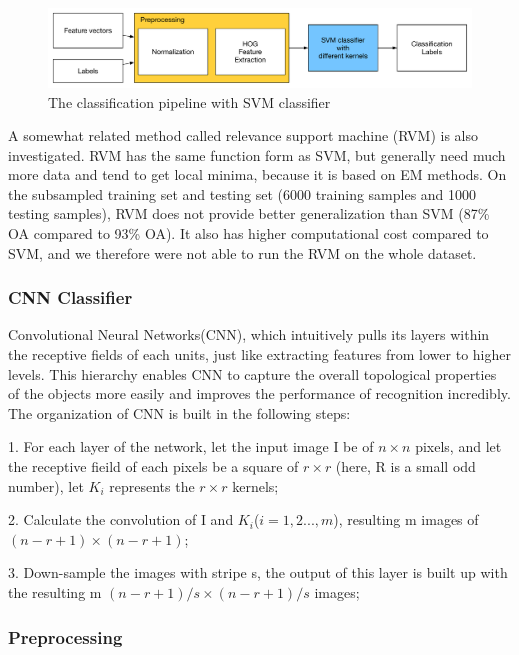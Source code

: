 \documentclass[12pt]{article}
\begin{document}
\begin{figure}[tbp]
	\centering
	\includegraphics[width =\textwidth]{pipeline-svm}		
	\caption{The classification pipeline with SVM classifier}
	\label{fig:pipeline-svm}
\end{figure}

A somewhat related method called relevance support machine (RVM) \cite{tipping2001sparse} is also investigated. RVM has the same function form as SVM, but generally need much more data and tend to get local minima, because it is based on EM methods. On the subsampled training set and testing set (6000 training samples and 1000 testing samples), RVM does not provide better generalization than SVM (87\% OA compared to 93\% OA). It also has higher computational cost compared to SVM, and we therefore were not able to run the RVM on the whole dataset.
 
\subsubsection{CNN Classifier}
Convolutional Neural Networks(CNN)\cite{krizhevsky2012imagenet}, which intuitively pulls its layers within the receptive fields of each units, just like extracting features from lower to higher levels. This hierarchy enables CNN to capture the overall topological properties of the objects more easily and improves the performance of recognition incredibly\cite{lecun1998gradient}.
The organization of CNN is built in the following steps: 

1. For each layer of the network, let the input image I be of $n \times n$ pixels, and let the receptive fieild of each pixels be a square of $r\times r$ (here, R is a small odd number), let $K_i$ represents the $r\times r$ kernels;

2. Calculate the convolution of I and $K_i$($i = 1,2...,m$), resulting m images of $(n-r+1) \times (n-r+1)$;

3. Down-sample the images with stripe s, the output of this layer is built up with the resulting m $(n-r+1)/s \times (n-r+1)/s$ images;
\subsubsection{Preprocessing}
\end{document}
